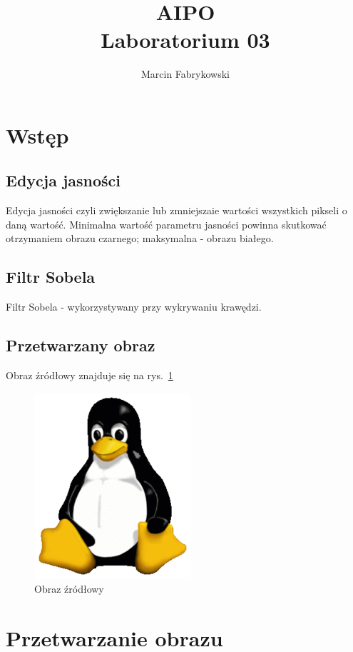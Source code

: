 \documentclass[a4paper, 12pt]{article}
\author{Marcin Fabrykowski}
\title{AIPO\\Laboratorium 03}
\begin{document}
\maketitle
\newpage
\section{Wstęp}
\subsection{Edycja jasności}
Edycja jasności czyli zwiększanie lub zmniejszaie wartości wszystkich pikseli o daną wartość. Minimalna wartość parametru jasności powinna skutkować otrzymaniem obrazu czarnego; maksymalna - obrazu białego.
\subsection{Filtr Sobela}
Filtr Sobela - wykorzystywany przy wykrywaniu krawędzi.
\subsection{Przetwarzany obraz}
Obraz źródłowy znajduje się na rys.~\ref{fig:src}
\begin{figure}[p]
\includegraphics{tux}
\caption{Obraz źródłowy}
\label{fig:src}
\end{figure}
\section{Przetwarzanie obrazu}
\end{document}
